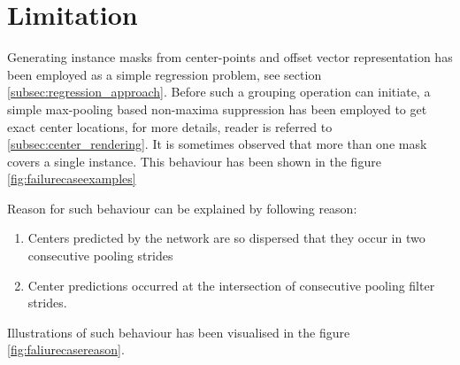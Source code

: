 \section{Limitation}

Generating instance masks from center-points and offset vector representation has been employed as a simple regression problem, see section \ref{subsec:regression_approach}. Before such a grouping operation can initiate, a simple max-pooling based non-maxima suppression has been employed to get exact center locations, for more details, reader is referred to \ref{subsec:center_rendering}. It is sometimes observed that more than one mask covers a single instance. 
This behaviour has been shown in the figure \ref{fig:failurecaseexamples}

Reason for such behaviour can be explained by following reason:

\begin{enumerate}
    \item Centers predicted by the network are so dispersed that they occur in two consecutive pooling strides
    \item Center predictions occurred at the intersection of consecutive pooling filter strides.
\end{enumerate}

Illustrations of such behaviour has been visualised in the figure \ref{fig:faliurecasereason}.

